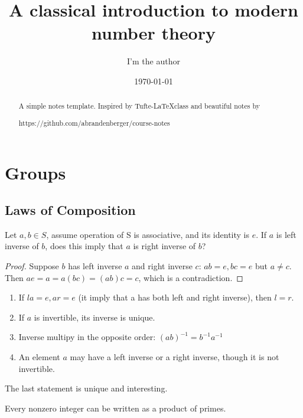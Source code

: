 \documentclass{tufte-handout}
\title{\centering A classical introduction to modern number theory}
\author{I'm the author}
\date{\today} %
\begin{document}
\maketitle%

\begin{abstract}
\noindent
A simple notes template. Inspired by Tufte-\LaTeX class and beautiful notes by \begin{verbatim*}
	https://github.com/abrandenberger/course-notes
\end{verbatim*}
\end{abstract}


\section{Groups}\label{sec:groups}

\subsection{Laws of Composition}


\begin{problem}
	Let $a, b\in S$, assume operation of S is associative, and its identity is $e$. If $a$ is left inverse of $b$, does this imply that $a$ is right inverse of $b$?
\end{problem}

\begin{proof}
	Suppose $b$ has left inverse $a$ and right inverse $c$: $ab = e, bc = e$ but $a\neq c$. Then $ae = a = a(bc)=(ab)c=c$, which is a contradiction.
\end{proof}

\begin{enumerate}
	\item If $la=e,ar=e$ (it imply that a has both left and right inverse), then $l=r$.
	\item If $a$ is invertible, its inverse is unique.
	\item Inverse multipy in the opposite order: $(ab)^{-1}=b^{-1}a^{-1}$
	\item An element $a$ may have a left inverse or a right inverse, though it is not invertible.
\end{enumerate}

The last statement is unique and interesting.

\begin{lemma}
	Every nonzero integer can be written as a product of primes.
\end{lemma}
\end{document}
